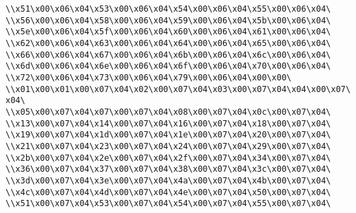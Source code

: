 \verb|\\x51\x00\x06\x04\x53\x00\x06\x04\x54\x00\x06\x04\x55\x00\x06\x04\|\newline
\verb|\\x56\x00\x06\x04\x58\x00\x06\x04\x59\x00\x06\x04\x5b\x00\x06\x04\|\newline
\verb|\\x5e\x00\x06\x04\x5f\x00\x06\x04\x60\x00\x06\x04\x61\x00\x06\x04\|\newline
\verb|\\x62\x00\x06\x04\x63\x00\x06\x04\x64\x00\x06\x04\x65\x00\x06\x04\|\newline
\verb|\\x66\x00\x06\x04\x67\x00\x06\x04\x6b\x00\x06\x04\x6c\x00\x06\x04\|\newline
\verb|\\x6d\x00\x06\x04\x6e\x00\x06\x04\x6f\x00\x06\x04\x70\x00\x06\x04\|\newline
\verb|\\x72\x00\x06\x04\x73\x00\x06\x04\x79\x00\x06\x04\x00\x00\|\newline
\verb|\\x01\x00\x01\x00\x07\x04\x02\x00\x07\x04\x03\x00\x07\x04\x04\x00\x07\x04\|\newline
\verb|\\x05\x00\x07\x04\x07\x00\x07\x04\x08\x00\x07\x04\x0c\x00\x07\x04\|\newline
\verb|\\x13\x00\x07\x04\x14\x00\x07\x04\x16\x00\x07\x04\x18\x00\x07\x04\|\newline
\verb|\\x19\x00\x07\x04\x1d\x00\x07\x04\x1e\x00\x07\x04\x20\x00\x07\x04\|\newline
\verb|\\x21\x00\x07\x04\x23\x00\x07\x04\x24\x00\x07\x04\x29\x00\x07\x04\|\newline
\verb|\\x2b\x00\x07\x04\x2e\x00\x07\x04\x2f\x00\x07\x04\x34\x00\x07\x04\|\newline
\verb|\\x36\x00\x07\x04\x37\x00\x07\x04\x38\x00\x07\x04\x3c\x00\x07\x04\|\newline
\verb|\\x3d\x00\x07\x04\x3e\x00\x07\x04\x4a\x00\x07\x04\x4b\x00\x07\x04\|\newline
\verb|\\x4c\x00\x07\x04\x4d\x00\x07\x04\x4e\x00\x07\x04\x50\x00\x07\x04\|\newline
\verb|\\x51\x00\x07\x04\x53\x00\x07\x04\x54\x00\x07\x04\x55\x00\x07\x04\|\newline
